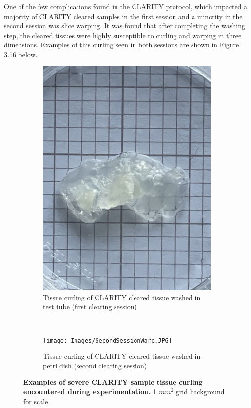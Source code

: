 One of the few complications found in the CLARITY protocol, which impacted a majority of CLARITY cleared samples in the first session and a minority in the second session was slice warping. It was found that after completing the washing step, the cleared tissues were highly susceptible to curling and warping in three dimensions. Examples of this curling seen in both sessions are shown in Figure 3.16 below.


\begin{figure}[H]
    \centering
    
    \begin{subfigure}[t]{0.475\textwidth}
    \centering
    \includegraphics[width=1\linewidth]{Images/FirstSessionWarp.JPG}
    \caption{Tissue curling of CLARITY cleared tissue washed in test tube (first clearing session)}
    \end{subfigure}
    ~
    \begin{subfigure}[t]{0.475\textwidth}
    \centering
    \texttt{[image: Images/SecondSessionWarp.JPG]}
    \caption{Tissue curling of CLARITY cleared tissue washed in petri dish (second clearing session)}
    \end{subfigure}
    \medskip
\caption{\textbf{Examples of severe CLARITY sample tissue curling encountered during experimentation.} 1 $mm^2$ grid background for scale.}
    \label{fig:enter-label}
\end{figure}

